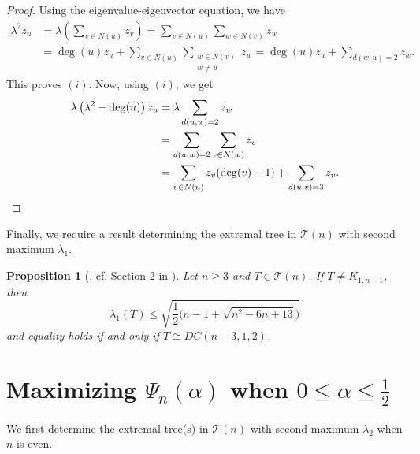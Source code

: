 \documentclass[11pt]{article}
\theoremstyle{plain}
\newtheorem{proposition}[theorem]{Proposition}
\numberwithin{equation}{section}
\begin{document}
\begin{proof}
Using the eigenvalue-eigenvector equation, we have
\begin{align*}
   \lambda^2z_u & = \lambda \left(\sum_{v\in N(u)}z_v\right)  = \sum_{v\in N(u)} \sum_{w\in N(v)} z_w\\
   & = \deg(u)z_u + \sum_{v\in N(u)} \sum_{\substack{w\in N(v)\\ w\neq u}} z_w = \deg(u)z_u + \sum_{d(w,u)=2} z_w.   
\end{align*}
This proves $(i)$. Now, using $(i)$, we get
\begin{align*}
 \lambda\left(\lambda^2 - \deg(u)\right)z_u & = \lambda\sum_{d(u,w) = 2} z_w\\
 & = \sum_{d(u,w) = 2} \sum_{v\in N(w)} z_v\\
 & = \sum_{v\in N(u)}z_v (\deg(v)-1) + \sum_{d(u,v) = 3}z_v. \qedhere
\end{align*}
\end{proof}

Finally, we require a result determining the extremal tree in $\mathcal{T}(n)$ with second maximum $\lambda_1$. 

\begin{proposition}[\cite{Hofmeister_1997}, cf. Section 2 in \cite{KMPZ_trees_diameter_2025}]\label{prop:second_largest_lambda_one_trees} Let $n\ge 3$ and $T\in \mathcal{T}(n)$. If $T\neq K_{1,n-1}$, then 
\[ \lambda_1(T)\le \sqrt{\frac{1}{2}\big(n-1+\sqrt{n^2-6n+13}\big)}\] and equality holds if and only if $T\cong DC(n-3, 1, 2)$. 
\end{proposition}  

\section{Maximizing $\Psi_n(\alpha)$ when $0\le \alpha \le \frac{1}{2}$}
\label{section:convex_combination_alpha_less_than_half}

We first determine the extremal tree(s) in $\mathcal{T}(n)$ with second maximum $\lambda_2$ when $n$ is even.
\end{document}
